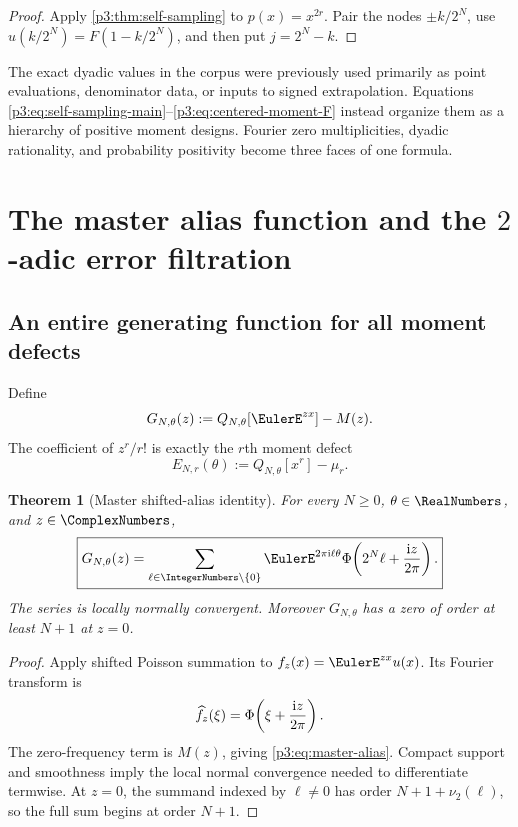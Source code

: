 \documentclass[11pt,oneside]{article}
\numberwithin{equation}{section}
\newtheorem{theorem}{Theorem}[section]
\theoremstyle{definition}
\theoremstyle{remark}
\begin{document}
\begin{proof}
Apply \cref{p3:thm:self-sampling} to $p(x)=x^{2r}$.  Pair the nodes $\pm k/2^N$, use $u(k/2^N)=F(1-k/2^N)$, and then put $j=2^N-k$.
\end{proof}

\begin{resultbox}
The exact dyadic values in the corpus were previously used primarily as point evaluations, denominator data, or inputs to signed extrapolation.  Equations \eqref{p3:eq:self-sampling-main}--\eqref{p3:eq:centered-moment-F} instead organize them as a hierarchy of positive moment designs.  Fourier zero multiplicities, dyadic rationality, and probability positivity become three faces of one formula.
\end{resultbox}

\section{The master alias function and the $2$-adic error filtration}
\label{p3:sec:alias}

\subsection{An entire generating function for all moment defects}

Define
\begin{equation}
 G_{N,\theta}(z)
 :=Q_{N,\theta}[\EulerE^{zx}]-M(z).
 \label{p3:eq:G-def}
\end{equation}
The coefficient of $z^r/r!$ is exactly the $r$th moment defect
\begin{equation}
 E_{N,r}(\theta)
 :=Q_{N,\theta}[x^r]-\mu_r.
 \label{p3:eq:ENr-def}
\end{equation}

\begin{theorem}[Master shifted-alias identity]
\label{p3:thm:master-alias}
For every $N\ge0$, $\theta\in\RealNumbers$, and $z\in\ComplexNumbers$,
\begin{equation}
 \boxed{\displaystyle
 G_{N,\theta}(z)
 =\sum_{\ell\in\IntegerNumbers\setminus\{0\}}
 \EulerE^{2\pi\iu\ell\theta}
 \Phi\!\left(2^N\ell+\frac{\iu z}{2\pi}\right).}
 \label{p3:eq:master-alias}
\end{equation}
The series is locally normally convergent.  Moreover $G_{N,\theta}$ has a zero of order at least $N+1$ at $z=0$.
\end{theorem}

\begin{proof}
Apply shifted Poisson summation to $f_z(x)=\EulerE^{zx}u(x)$.  Its Fourier transform is
\[
 \widehat f_z(\xi)
 =\Phi\!\left(\xi+\frac{\mathrm i z}{2\pi}\right).
\]
The zero-frequency term is $M(z)$, giving \eqref{p3:eq:master-alias}.  Compact support and smoothness imply the local normal convergence needed to differentiate termwise.  At $z=0$, the summand indexed by $\ell\ne0$ has order
$N+1+\nu_2(\ell)$, so the full sum begins at order $N+1$.
\end{proof}
\end{document}
